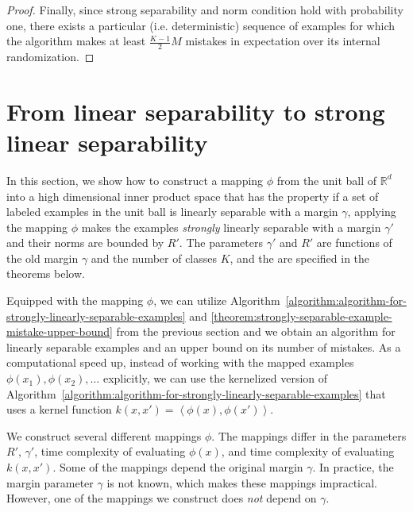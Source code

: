 \documentclass[12pt]{article}
\newcommand{\R}{\mathbb{R}}  %
\newcommand{\ip}[2]{\left\langle #1, #2 \right\rangle} %
\begin{document}
\begin{proof}
Finally, since strong separability and norm condition hold with probability one,
there exists a particular (i.e. deterministic) sequence of examples for which
the algorithm makes at least $\frac{K-1}{2} M$ mistakes in expectation
over its internal randomization.
\end{proof}

\section{From linear separability to strong linear separability}
\label{section:from-linear-separability-to-strong-linear-separability}

In this section, we show how to construct a mapping $\phi$ from the unit
ball of $\R^d$ into a high dimensional inner product space that has the
property if a set of labeled examples in the unit ball is linearly separable with a
margin $\gamma$, applying the mapping $\phi$ makes the examples \emph{strongly}
linearly separable with a margin $\gamma'$ and their norms are bounded by $R'$.
The parameters $\gamma'$ and $R'$ are functions of the old margin $\gamma$ and
the number of classes $K$, and the are specified in the theorems below.

Equipped with the mapping $\phi$, we can utilize
Algorithm~\ref{algorithm:algorithm-for-strongly-linearly-separable-examples} and
\autoref{theorem:strongly-separable-example-mistake-upper-bound} from the
previous section and we obtain an algorithm for linearly separable examples and
an upper bound on its number of mistakes. As a computational speed up, instead
of working with the mapped examples $\phi(x_1), \phi(x_2), \dots$ explicitly, we
can use the kernelized version of
Algorithm~\ref{algorithm:algorithm-for-strongly-linearly-separable-examples}
that uses a kernel function $k(x,x') = \ip{\phi(x)}{\phi(x')}$.

We construct several different mappings $\phi$. The mappings differ in the
parameters $R'$, $\gamma'$, time complexity of evaluating $\phi(x)$, and time
complexity of evaluating $k(x,x')$. Some of the mappings depend the original
margin $\gamma$. In practice, the margin parameter $\gamma$ is not known, which
makes these mappings impractical. However, one of the mappings we construct
does \emph{not} depend on $\gamma$.
\end{document}
